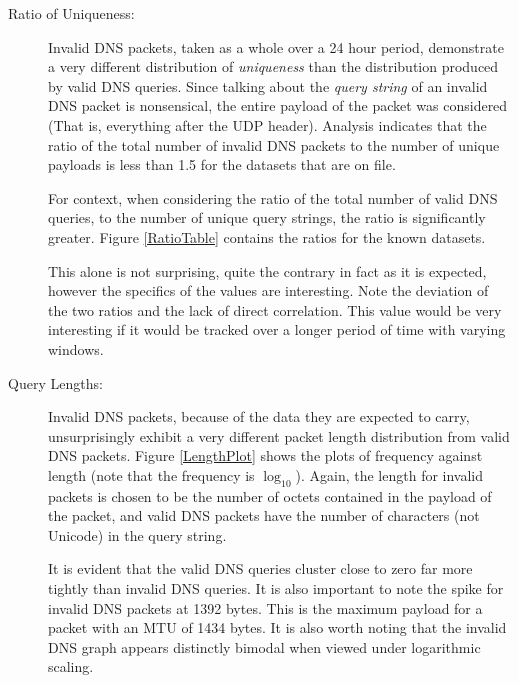 \documentclass{article}
\theoremstyle{remark}
\theoremstyle{definition}
\theoremstyle{definition}
\theoremstyle{definition}
\begin{document}
\begin{description}
\item[Ratio of Uniqueness: ] Invalid DNS packets, taken as a whole over a 24 hour period, demonstrate a very different distribution of \emph{uniqueness} than the distribution produced by valid DNS queries. Since talking about the \emph{query string} of an invalid DNS packet is nonsensical, the entire payload of the packet was considered (That is, everything after the UDP header). Analysis indicates that the ratio of the total number of invalid DNS packets to the number of unique payloads is less than 1.5 for the datasets that are on file.

For context, when considering the ratio of the total number of valid DNS queries, to the number of unique query strings, the ratio is significantly greater. Figure \ref{RatioTable} contains the ratios for the known datasets.

This alone is not surprising, quite the contrary in fact as it is expected, however the specifics of the values are interesting. Note the deviation of the two ratios and the lack of direct correlation. This value would be very interesting if it would be tracked over a longer period of time with varying windows.

\item[Query Lengths: ] Invalid DNS packets, because of the data they are expected to carry, unsurprisingly exhibit a very different packet length distribution from valid DNS packets. Figure \ref{LengthPlot} shows the plots of frequency against length (note that the frequency is $\log_{10}$). Again, the length for invalid packets is chosen to be the number of octets contained in the payload of the packet, and valid DNS packets have the number of characters (not Unicode) in the query string.

It is evident that the valid DNS queries cluster close to zero far more tightly than invalid DNS queries. It is also important to note the spike for invalid DNS packets at 1392 bytes. This is the maximum payload for a packet with an MTU of 1434 bytes. It is also worth noting that the invalid DNS graph appears distinctly bimodal when viewed under logarithmic scaling.


\end{description}
\end{document}
